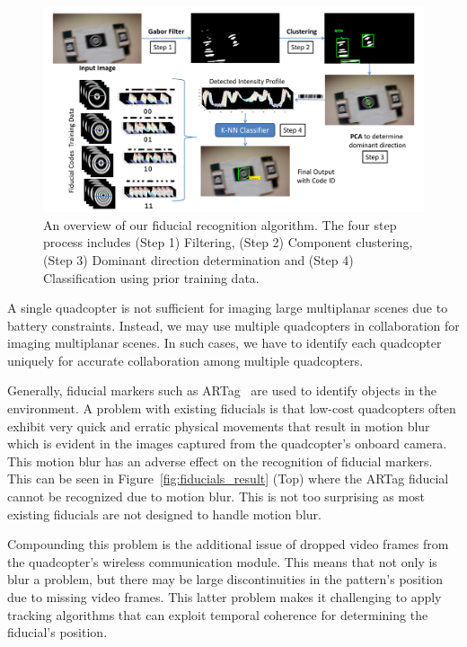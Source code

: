 \begin{figure}[h!]
\centering
\includegraphics[width=0.98\linewidth]{figures/fiducial/overall_flow}
\caption[Overall Workflow of blur resilient fiducial recognition algorithm]{An
overview of our fiducial recognition algorithm.
    The four step process includes (Step 1) Filtering,
    (Step 2) Component clustering, (Step 3) Dominant direction determination
    and (Step 4) Classification using prior training data.}
 \label{fig:fiducial_workflow}
\end{figure}

A single quadcopter is not sufficient for imaging large multiplanar scenes due
to battery constraints. Instead, we may use multiple quadcopters in
collaboration for imaging multiplanar scenes. In such cases, we have to identify
each quadcopter uniquely for accurate collaboration among multiple quadcopters. 

Generally, fiducial markers such as ARTag~\cite{Fiala05} are used to identify
objects in the environment. A problem with existing fiducials is that low-cost
quadcopters often exhibit very quick and erratic physical movements that result
in motion blur which is evident in the images captured from the quadcopter's
onboard camera. This motion blur has an adverse effect on the recognition of fiducial
markers. This can be seen in Figure~\ref{fig:fiducials_result} (Top) where the
ARTag fiducial cannot be recognized due to motion blur. This is not too
surprising as most existing fiducials are not designed to handle motion blur.

Compounding this problem is the additional issue of dropped video
frames from the quadcopter's wireless communication module. This means
that not only is blur a problem, but there may be large
discontinuities in the pattern's position due to missing video
frames. This latter problem makes it challenging to apply tracking algorithms
that can exploit temporal coherence for determining the fiducial's position.

